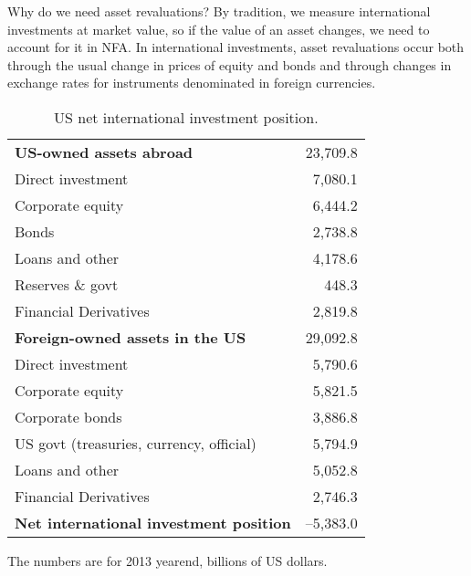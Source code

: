 Why do we need asset revaluations?  By tradition, we
measure international investments at market value, so if the value
of an asset changes, we need to account for it in NFA.
In international investments, asset revaluations occur both through the usual change in
prices of equity and bonds and through changes in exchange rates
for instruments denominated in foreign currencies.


\begin{table}
\centering
\caption{US net international investment position.}
\begin{tabular*}{0.8\textwidth}{l@{\extracolsep{\fill}}r}
\toprule
{\bf US-owned assets abroad}            &  23,709.8 \\
\hspace{5mm}Direct investment           &  7,080.1 \\
\hspace{5mm}Corporate equity            &  6,444.2 \\
\hspace{5mm}Bonds\index{bond}           &  2,738.8 \\
\hspace{5mm}Loans and other             &  4,178.6 \\
\hspace{5mm}Reserves \& govt            &  448.3 \\
\hspace{5mm}Financial Derivatives       & 2,819.8 \\
\addlinespace
{\bf Foreign-owned assets in the US}    & 29,092.8 \\
\hspace{5mm}Direct investment           & 5,790.6 \\
\hspace{5mm}Corporate equity            & 5,821.5  \\
\hspace{5mm}Corporate bonds\index{bond} &  3,886.8 \\
\hspace{5mm}US govt (treasuries, currency, official) &  5,794.9  \\
\hspace{5mm}Loans and other             &  5,052.8      \\
\hspace{5mm}Financial Derivatives       & 2,746.3 \\
\addlinespace
{\bf Net international investment position} &  --5,383.0  \\
\bottomrule
\end{tabular*}
\begin{minipage}{0.8\textwidth}
\footnotesize{%
\smallskip
The numbers are for 2013 yearend, billions of US dollars.}
\end{minipage}
\label{tab:usniip}
\end{table}

